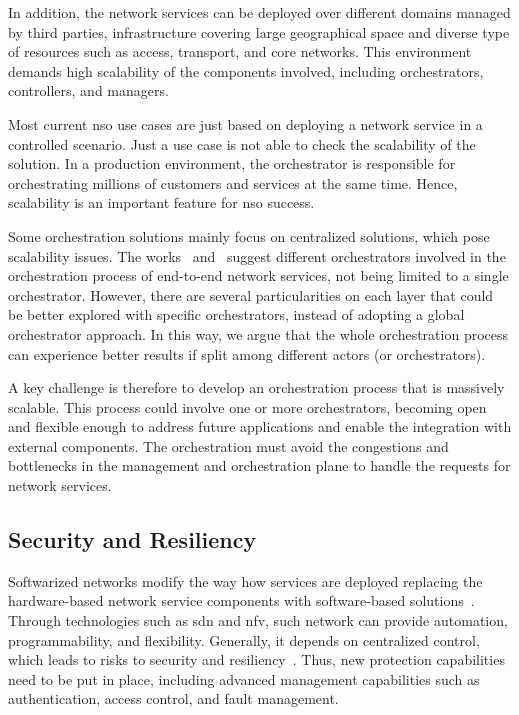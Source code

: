 In addition, the network services can be deployed over different domains managed by third parties, infrastructure covering large geographical space and diverse type of resources such as access, transport, and core networks. This environment demands high scalability of the components involved, including orchestrators, controllers, and managers. 

Most current \gls{nso} use cases are just based on deploying a network service in a controlled scenario. Just a use case is not able to check the scalability of the solution. In a production environment, the orchestrator is responsible for orchestrating millions of customers and services at the same time. Hence, scalability is an important feature for \gls{nso} success.

Some orchestration solutions mainly focus on centralized solutions, which pose scalability issues. The works~\cite{Alvizu2016AdvanceEra} and~\cite{Garay2016ServiceForward} suggest different orchestrators involved in the orchestration process of end-to-end network services, not being limited to a single orchestrator. However, there are several particularities on each layer that could be better explored with specific orchestrators, instead of adopting a global orchestrator approach. In this way, we argue that the whole orchestration process can experience better results if split among different actors (or orchestrators). 

A key challenge is therefore to develop an orchestration process that is massively scalable. This process could involve one or more orchestrators, becoming open and flexible enough to address future applications and enable the integration with external components. The orchestration must avoid the congestions and bottlenecks in the management and orchestration plane to handle the requests for network services.
  


\subsection{Security and Resiliency}

Softwarized networks modify the way how services are deployed replacing the hardware-based network service components with software-based solutions~\cite{Draxler2017SONATA:Networksb}. Through technologies such as \gls{sdn} and \gls{nfv}, such network can provide automation, programmability, and flexibility. Generally, it depends on centralized control, which leads to risks to security and resiliency~\cite{Arfaoui2017SecurityDirections}. Thus, new protection capabilities need to be put in place, including advanced management capabilities such as authentication, access control, and fault management. 

